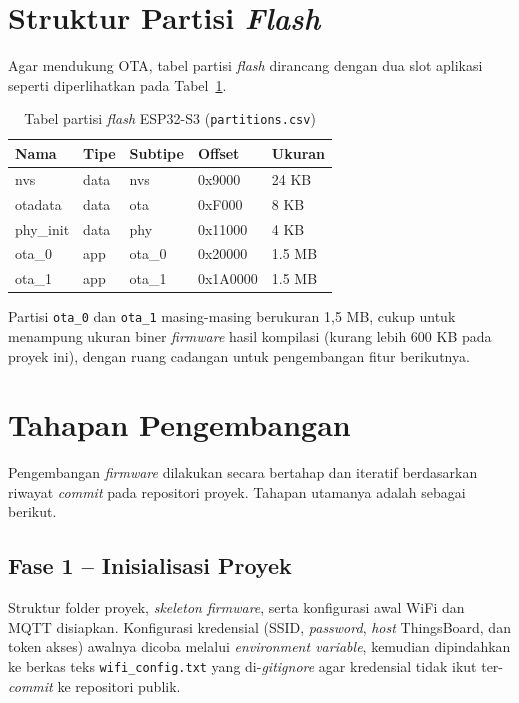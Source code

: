 \documentclass[12pt,a4paper]{report}
\begin{document}
\section{Struktur Partisi \textit{Flash}}
Agar mendukung OTA, tabel partisi \textit{flash} dirancang dengan dua slot aplikasi seperti
diperlihatkan pada Tabel~\ref{tab:partisi}.

\begin{table}[H]
\centering
\caption{Tabel partisi \textit{flash} ESP32-S3 (\texttt{partitions.csv})}
\label{tab:partisi}
\begin{tabular}{|l|l|l|l|l|}
\hline
\textbf{Nama} & \textbf{Tipe} & \textbf{Subtipe} & \textbf{Offset} & \textbf{Ukuran} \\
\hline
nvs      & data & nvs   & 0x9000  & 24 KB \\
otadata  & data & ota   & 0xF000  & 8 KB \\
phy\_init & data & phy  & 0x11000 & 4 KB \\
ota\_0   & app  & ota\_0 & 0x20000 & 1.5 MB \\
ota\_1   & app  & ota\_1 & 0x1A0000 & 1.5 MB \\
\hline
\end{tabular}
\end{table}

Partisi \texttt{ota\_0} dan \texttt{ota\_1} masing-masing berukuran 1,5 MB, cukup
untuk menampung ukuran biner \textit{firmware} hasil kompilasi (kurang lebih 600 KB pada
proyek ini), dengan ruang cadangan untuk pengembangan fitur berikutnya.

\section{Tahapan Pengembangan}
Pengembangan \textit{firmware} dilakukan secara bertahap dan iteratif berdasarkan riwayat
\textit{commit} pada repositori proyek. Tahapan utamanya adalah sebagai berikut.

\subsection{Fase 1 -- Inisialisasi Proyek}
Struktur folder proyek, \textit{skeleton firmware}, serta konfigurasi awal WiFi dan MQTT
disiapkan. Konfigurasi kredensial (SSID, \textit{password}, \textit{host} ThingsBoard, dan token
akses) awalnya dicoba melalui \textit{environment variable}, kemudian dipindahkan ke berkas
teks \texttt{wifi\_config.txt} yang di-\textit{gitignore} agar kredensial tidak
ikut ter-\textit{commit} ke repositori publik.
\end{document}
